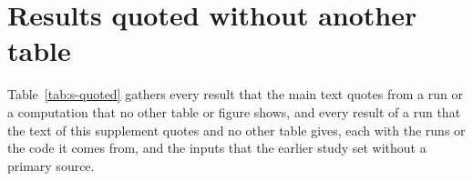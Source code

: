 \documentclass[preprint,12pt]{elsarticle}
\begin{document}

\section{Results quoted without another table}
\label{sec:s-quoted}

Table~\ref{tab:s-quoted} gathers every result that the main text quotes from a run or a computation that no other table or figure shows, and every result of a run that the text of this supplement quotes and no other table gives, each with the runs or the code it comes from, and the inputs that the earlier study set without a primary source.




\end{document}
